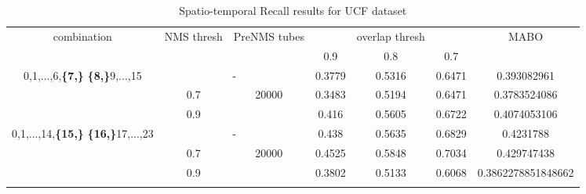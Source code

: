 \begin{center}
  \en
  \setlength{\tabcolsep}{2pt}
\begin{longtable}{||c | c | c | c c c| c|}

  \hline
  \multirow{2}{*}{combination} & \multirow{2}{2.5em}{NMS thresh} & \multirow{2}{3.5em}{PreNMS tubes} &  {} &overlap thresh & {} & \multirow{2}{*}{MABO} \\
  {} & {} & {} &  0.9 &  0.8 & 0.7 & {}\\         
  \hline
  \multirow{3}{7em}{0,1,...,6,\textbf{\{7,\}}
  \textbf{\{8,\}}9,...,15 }   &   \multicolumn{2}{|c|}{-}     &  0.3779 & 0.5316 & 0.6471 & 0.393082961 \\
  \cline{2-7}
  {} & 0.7 &\multirow{2}{*}{20000}  & 0.3483  & 0.5194 & 0.6471 & 0.3783524086 \\
  \cline{2-2} \cline{4-7} 
  {} &  0.9   & {}   & 0.416 & 0.5605 & 0.6722 & 0.4074053106 \\
  \hline                                    
  \multirow{3}{7em}{0,1,...,14,\textbf{\{15,\}}
  \textbf{\{16,\}}17,...,23 }  &   \multicolumn{2}{|c|}{-} & 0.438 & 0.5635 & 0.6829 & 0.4231788 \\
  \cline{2-7}
  {} & 0.7 & \multirow{2}{*}{20000}   & 0.4525 & 0.5848 & 0.7034 & 0.429747438 \\
  \cline{2-2} \cline{4-7} 
  {} &  0.9   & {}   & 0.3802 & 0.5133 & 0.6068 & 0.3862278851848662 \\

  \hline                                    

  \caption{Spatio-temporal Recall results for UCF dataset}
  \label{table:gr_ucf_nms_noup_recall}
\end{longtable} 
\end{center}

